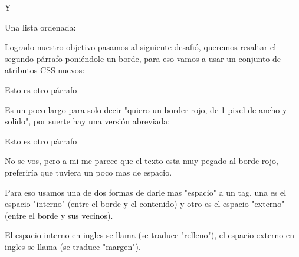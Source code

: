 \documentclass[letterpaper,10pt,spanish]{sphinxmanual}
\begin{document}
Y

%
\begin{sphinxVerbatim}[commandchars=\\\{\}]
Una  lista ordenada:
\end{sphinxVerbatim}

Logrado nuestro objetivo pasamos al siguiente desafió, queremos resaltar el segundo párrafo poniéndole un borde, para eso vamos a usar un conjunto de atributos CSS nuevos:

%
\begin{sphinxVerbatim}[commandchars=\\\{\}]
 Esto es otro párrafo
\end{sphinxVerbatim}

Es un poco largo para solo decir "quiero un border rojo, de 1 pixel de ancho y solido", por suerte hay una versión abreviada:

%
\begin{sphinxVerbatim}[commandchars=\\\{\}]
 Esto es otro párrafo
\end{sphinxVerbatim}

No se vos, pero a mi me parece que el texto esta muy pegado al borde rojo,
preferiría que tuviera un poco mas de espacio.

Para eso usamos una de dos formas de darle mas "espacio" a un tag, una es el
espacio "interno" (entre el borde y el contenido) y otro es el espacio
"externo" (entre el borde y sus vecinos).

El espacio interno en ingles se llama  (se traduce "relleno"), el
espacio externo en ingles se llama  (se traduce "margen").
\end{document}
